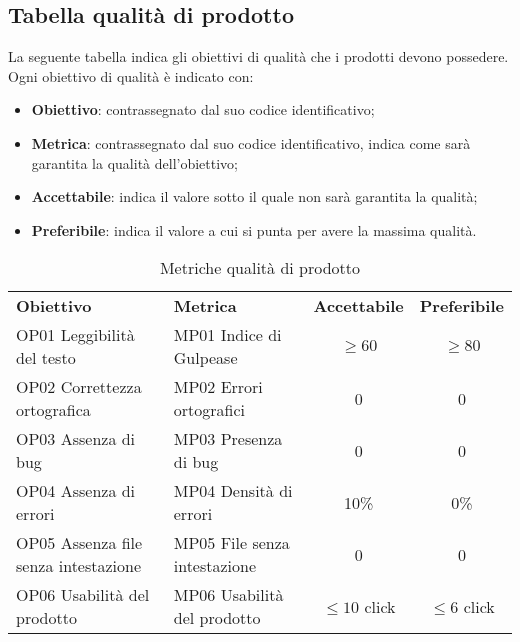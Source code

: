 \documentclass[../piano_di_qualifica.tex]{subfiles}
\begin{document}
\subsection{Tabella qualità di prodotto}
La seguente tabella indica gli obiettivi di qualità che i prodotti devono possedere.\\
Ogni obiettivo di qualità è indicato con:
\smallbreak
\begin{itemize}
	\item \textbf{Obiettivo}: contrassegnato dal suo codice identificativo;
	\item \textbf{Metrica}: contrassegnato dal suo codice identificativo, indica come sarà garantita la qualità dell'obiettivo;
	\item \textbf{Accettabile}: indica il valore sotto il quale non sarà garantita la qualità;
	\item \textbf{Preferibile}: indica il valore a cui si punta per avere la massima qualità.
\end{itemize}

\begin{table}[!ht]
	\centering
	\begin{tabular}{|l|l|c|c|}
		\hline
		\rowcolor{lightgray}
		\textbf{Obiettivo}                    	& \textbf{Metrica}             & \textbf{Accettabile} & \textbf{Preferibile} \\
		OP01 Leggibilità del testo           	& MP01 Indice di Gulpease      & \(\ge 60\)           & \(\ge 80\)           \\
		OP02 Correttezza ortografica         	& MP02 Errori ortografici      & 0                    & 0                    \\
		OP03 Assenza di bug                  	& MP03 Presenza di bug         & 0                    & 0                    \\
		OP04 Assenza di errori              	& MP04 Densità di errori       & 10\%                 & 0\%                  \\
		OP05 Assenza file senza intestazione 	& MP05 File senza intestazione & 0                    & 0                    \\
		OP06 Usabilità del prodotto          	& MP06 Usabilità del prodotto  & \(\leq10\) click     & \(\leq6\) click      \\
		\hline
	\end{tabular}
	\caption{Metriche qualità di prodotto}
\end{table}

\clearpage
\end{document}
